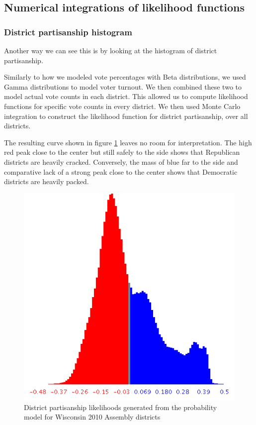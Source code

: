 \documentclass[preprint,12pt]{article}
\begin{document}
\subsection{Numerical integrations of likelihood functions}
\subsubsection{District partisanship histogram}
 
Another way we can see this is by looking at the histogram of district partisanship.
 
Similarly to how we modeled vote percentages with Beta distributions, we used Gamma distributions to model voter turnout.  We then combined these two to model actual vote counts in each district.  This allowed us to compute likelihood functions for specific vote counts in every district.  We then used Monte Carlo integration to construct the likelihood function for district partisanship, over all districts.
 
The resulting curve shown in figure \ref{fig:LikelihoodsDistrictPartisanship} leaves no room for interpretation.  The high red peak close to the center but still safely to the side shows that Republican districts are heavily cracked.  Conversely, the mass of blue far to the side and comparative lack of a strong peak close to the center shows that Democratic districts are heavily packed.
 
\begin{figure}[htb!]
    \begin{center}
        \includegraphics[scale=0.6]{../Figures/WI2010/district_partisan_likelihoods.png}
        \caption{District partisanship likelihoods generated from the probability model for Wisconsin 2010 Assembly districts}\label{fig:LikelihoodsDistrictPartisanship}
    \end{center}
\end{figure}
\end{document}
